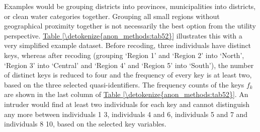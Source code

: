 \documentclass[letterpaper,10pt,english]{sphinxmanual}
\begin{document}
Examples would be grouping districts
into provinces, municipalities into districts, or clean water categories
together. Grouping all small regions without geographical proximity
together is not necessarily the best option from the utility
perspective. \hyperref[\detokenize{anon_methods:tab52}]{Table \ref{\detokenize{anon_methods:tab52}}} illustrates this with a very simplified example
dataset. Before recoding, three individuals have distinct keys, whereas
after recoding (grouping ‘Region 1’ and ‘Region 2’ into ‘North’, ‘Region
3’ into ‘Central’ and ‘Region 4’ and ‘Region 5’ into ‘South’), the
number of distinct keys is reduced to four and the frequency of every
key is at least two, based on the three selected quasi-identifiers. The
frequency counts of the keys \(f_{k}\) are shown in the last column
of \hyperref[\detokenize{anon_methods:tab52}]{Table \ref{\detokenize{anon_methods:tab52}}}. An intruder would find at least two individuals for each
key and cannot distinguish any more between individuals 1 \textendash{} 3,
individuals 4 and 6, individuals 5 and 7 and individuals 8 \textendash{} 10, based
on the selected key variables.
\end{document}
